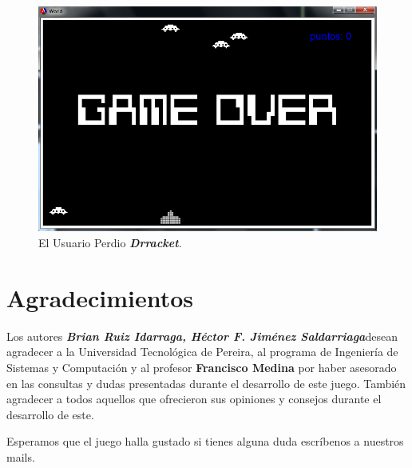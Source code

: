 \documentclass[a4paper]{article} %
\begin{document}
\begin{figure}
  \centering
    \includegraphics[scale=0.7]{images/fin}
  \caption{El Usuario Perdio \textbf{\textit{Drracket}}.}
  \label{fig:finalperdio}
\end{figure}

\clearpage
\newpage
\section{Agradecimientos}
Los autores \textbf{\emph{Brian Ruiz Idarraga, Héctor F. Jiménez Saldarriaga}}desean agradecer a la Universidad Tecnológica de Pereira, al programa de Ingeniería de Sistemas y Computación y al profesor \textbf{Francisco Medina} por haber asesorado en las consultas y dudas presentadas durante el desarrollo de este juego. También agradecer a todos aquellos que ofrecieron sus opiniones y consejos durante el desarrollo de este.

Esperamos que el juego halla gustado si tienes alguna duda escríbenos a nuestros mails.
\end{document}
